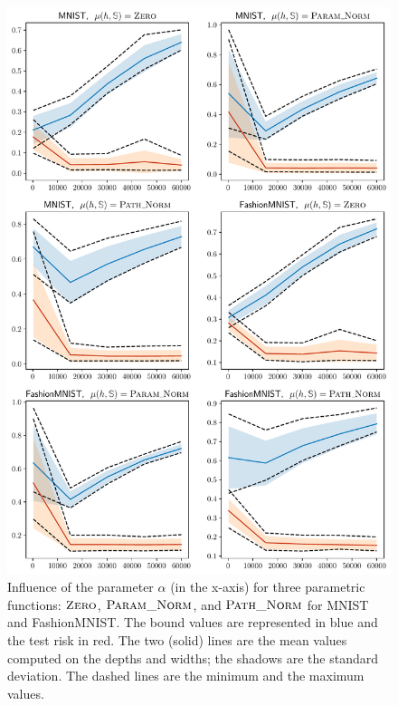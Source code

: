 \begin{figure}
    \centering
    \includegraphics[width=0.82\linewidth]{chapter_7/figures/influence_alpha_summary.pdf}
    \caption[Influence of the Parameter $\alpha$]{
    Influence of the parameter $\alpha$ (in the x-axis) for three parametric functions: $\text{\sc Zero}$, $\text{\sc Param\_Norm}$, and $\text{\sc Path\_Norm}$ for MNIST and FashionMNIST.
    The bound values are represented in blue and the test risk in red. 
    The two (solid) lines are the mean values computed on the depths and widths; the shadows are the standard deviation.
    The dashed lines are the minimum and the maximum values.
    }
    \label{chap:dis-mu:fig:influence-alpha}
\end{figure}

